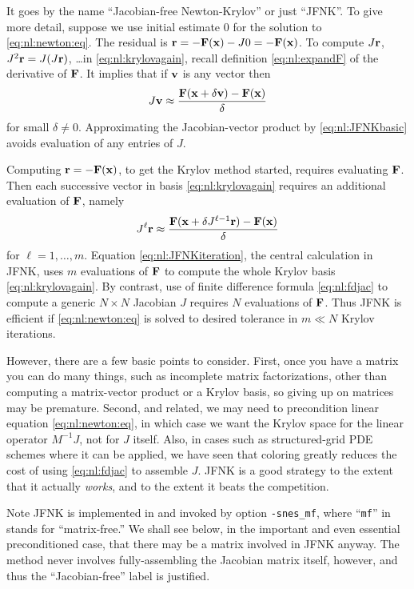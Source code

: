 It goes by the name ``Jacobian-free Newton-Krylov'' \citep{KnollKeyes2004} or just ``JFNK''.  To give more detail, suppose we use initial estimate $0$ for the solution to \eqref{eq:nl:newton:eq}.  The residual is $\mathbf{r} = - \mathbf{F}(\mathbf{x}) - J 0 = - \mathbf{F}(\mathbf{x})$.  To compute $J\mathbf{r}$, $J^2\mathbf{r}=J(J\mathbf{r})$, \dots in \eqref{eq:nl:krylovagain}, recall definition \eqref{eq:nl:expandF} of the derivative of $\mathbf{F}$.  It implies that if $\mathbf{v}$ is any vector then
\begin{equation}
J \mathbf{v} \approx \frac{\mathbf{F}(\mathbf{x}+\delta \mathbf{v}) - \mathbf{F}(\mathbf{x})}{\delta} \label{eq:nl:JFNKbasic}
\end{equation}
for small $\delta \ne 0$.  Approximating the Jacobian-vector product by \eqref{eq:nl:JFNKbasic} avoids evaluation of any entries of $J$.

Computing $\mathbf{r} = - \mathbf{F}(\mathbf{x})$, to get the Krylov method started, requires evaluating $\mathbf{F}$.  Then each successive vector in basis \eqref{eq:nl:krylovagain} requires an additional evaluation of $\mathbf{F}$, namely
\begin{equation}
J^{\ell} \mathbf{r} \approx \frac{\mathbf{F}(\mathbf{x}+\delta J^{\ell-1}\mathbf{r}) - \mathbf{F}(\mathbf{x})}{\delta} \label{eq:nl:JFNKiteration}
\end{equation}
for $\ell=1,\dots,m$.  Equation \eqref{eq:nl:JFNKiteration}, the central calculation in JFNK, uses $m$ evaluations of $\mathbf{F}$ to compute the whole Krylov basis \eqref{eq:nl:krylovagain}.  By contrast, use of finite difference formula \eqref{eq:nl:fdjac} to compute a generic $N\times N$ Jacobian $J$ requires $N$ evaluations of $\mathbf{F}$.  Thus JFNK is efficient if \eqref{eq:nl:newton:eq} is solved to desired tolerance in $m\ll N$ Krylov iterations.

However, there are a few basic points to consider.  First, once you have a matrix you can do many things, such as incomplete matrix factorizations, other than computing a matrix-vector product or a Krylov basis, so giving up on matrices may be premature.  Second, and related, we may need to precondition linear equation \eqref{eq:nl:newton:eq}, in which case we want the Krylov space for the linear operator $M^{-1}J$, not for $J$ itself.  Also, in cases such as structured-grid PDE schemes where it can be applied, we have seen that coloring greatly reduces the cost of using \eqref{eq:nl:fdjac} to assemble $J$.  JFNK is a good strategy to the extent that it actually \emph{works}, and to the extent it beats the competition.

Note JFNK is implemented in \PETSc and invoked by option \texttt{-snes\_mf}, where ``\texttt{mf}'' in stands for ``matrix-free.''  We shall see below, in the important and even essential preconditioned case, that there may be a matrix involved in JFNK anyway.  The method never involves fully-assembling the Jacobian matrix itself, however, and thus the ``Jacobian-free'' label is justified.

